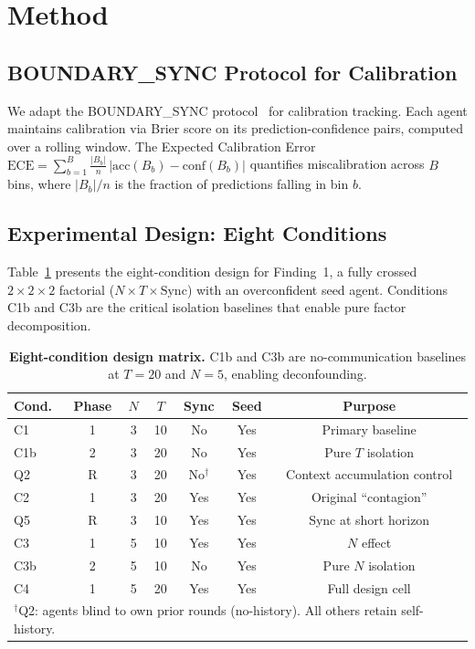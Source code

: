 \documentclass[11pt]{article}
\newcommand{\ECE}{\ensuremath{\mathrm{ECE}}}
\theoremstyle{definition}
\theoremstyle{remark}
\begin{document}
\section{Method}

\subsection{BOUNDARY\_SYNC Protocol for Calibration}

We adapt the BOUNDARY\_SYNC protocol~\citep{boundarysync2026} for calibration tracking. Each agent maintains calibration via Brier score on its prediction-confidence pairs, computed over a rolling window. The Expected Calibration Error $\ECE = \sum_{b=1}^{B} \frac{|B_b|}{n}\,|\mathrm{acc}(B_b) - \mathrm{conf}(B_b)|$ quantifies miscalibration across $B$ bins, where $|B_b|/n$ is the fraction of predictions falling in bin $b$.

\subsection{Experimental Design: Eight Conditions}

Table~\ref{tab:design} presents the eight-condition design for Finding~1, a fully crossed $2 \times 2 \times 2$ factorial ($N \times T \times \text{Sync}$) with an overconfident seed agent. Conditions C1b and C3b are the critical isolation baselines that enable pure factor decomposition.

\begin{table}[H]
\centering
\caption{\textbf{Eight-condition design matrix.} C1b and C3b are no-communication baselines at $T{=}20$ and $N{=}5$, enabling deconfounding.}
\label{tab:design}
\begin{tabular}{@{}lcccccc@{}}
\toprule
Cond. & Phase & $N$ & $T$ & Sync & Seed & Purpose \\
\midrule
C1  & 1 & 3 & 10 & No  & Yes & Primary baseline \\
C1b & 2 & 3 & 20 & No  & Yes & Pure $T$ isolation \\
Q2  & R & 3 & 20 & No$^\dagger$ & Yes & Context accumulation control \\
C2  & 1 & 3 & 20 & Yes & Yes & Original ``contagion'' \\
Q5  & R & 3 & 10 & Yes & Yes & Sync at short horizon \\
C3  & 1 & 5 & 10 & Yes & Yes & $N$ effect \\
C3b & 2 & 5 & 10 & No  & Yes & Pure $N$ isolation \\
C4  & 1 & 5 & 20 & Yes & Yes & Full design cell \\
\bottomrule
\multicolumn{7}{l}{\footnotesize $^\dagger$Q2: agents blind to own prior rounds (no-history). All others retain self-history.} \\
\end{tabular}
\end{table}
\end{document}
